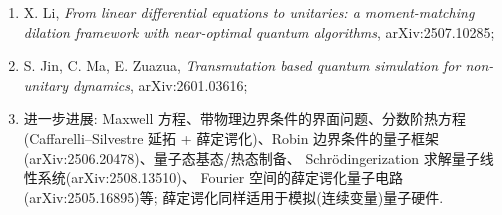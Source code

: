 \documentclass[utf8]{article} %
\numberwithin{equation}{section}   %
\newtheorem{Note}{\hskip 2em {\color{red} 注}}[subsection]
\begin{document}
\begin{Note}[薛定谔化方法的文献]
\begin{enumerate}
{        non-unitary dynamics with near-optimal dependence on all parameters},
        Communications in Mathematical Physics 407, 19 (2026); arXiv:2312.03916;
        \item X. Li, \emph{From linear differential equations to unitaries:
        a moment-matching dilation framework with near-optimal quantum algorithms},
        arXiv:2507.10285;
        \item S. Jin, C. Ma, E. Zuazua, \emph{Transmutation based quantum simulation
        for non-unitary dynamics}, arXiv:2601.03616;
        \item 进一步进展: Maxwell 方程、带物理边界条件的界面问题、分数阶热方程
        (Caffarelli--Silvestre 延拓 + 薛定谔化)、Robin 边界条件的量子框架
        (arXiv:2506.20478)、量子态基态/热态制备、
        Schrödingerization 求解量子线性系统(arXiv:2508.13510)、
        Fourier 空间的薛定谔化量子电路(arXiv:2505.16895)等;
        薛定谔化同样适用于模拟(连续变量)量子硬件.
    \end{enumerate}
\end{Note}
\end{document}
